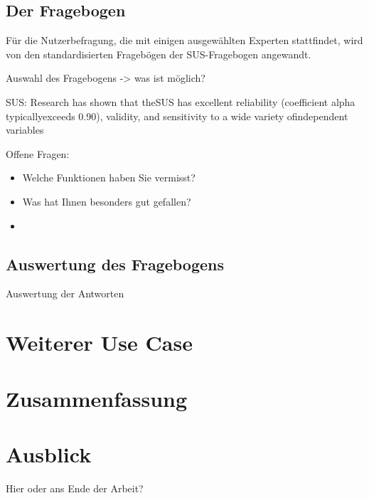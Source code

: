 \subsection{Der Fragebogen}
Für die Nutzerbefragung, die mit einigen ausgewählten Experten stattfindet, wird von den standardisierten Fragebögen der SUS-Fragebogen angewandt. 

Auswahl des Fragebogens -> was ist möglich?

SUS: Research has shown that theSUS  has  excellent  reliability  (coefficient  alpha  typicallyexceeds 0.90), validity, and sensitivity to a wide variety ofindependent variables

Offene Fragen:
\begin{itemize}
\item Welche Funktionen haben Sie vermisst?
\item Was hat Ihnen besonders gut gefallen?
\item 
\end{itemize}

\subsection{Auswertung des Fragebogens}
Auswertung der Antworten

\section{Weiterer Use Case}

\section{Zusammenfassung}

\section{Ausblick}
Hier oder ans Ende der Arbeit?